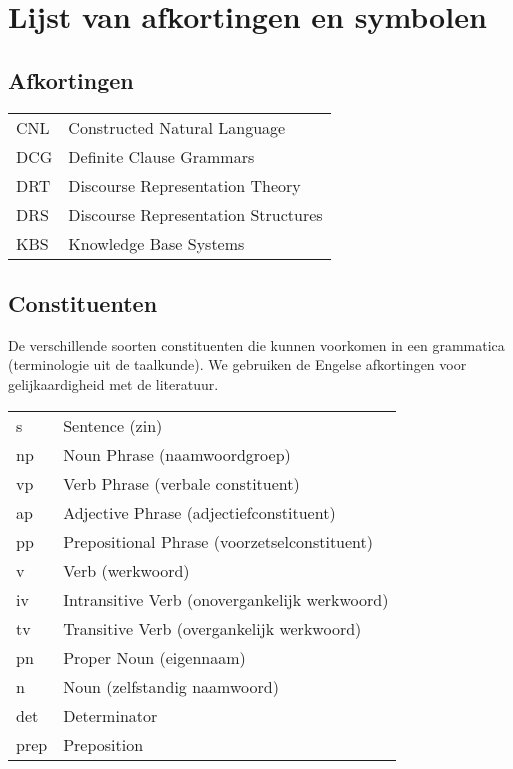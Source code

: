 \chapter{Lijst van afkortingen en symbolen}
\section*{Afkortingen}
\begin{flushleft}
  \renewcommand{\arraystretch}{1.1}
  \begin{tabularx}{\textwidth}{@{}p{12mm}X@{}}
    CNL   & Constructed Natural Language \\
    DCG   & Definite Clause Grammars \\
    DRT   & Discourse Representation Theory \\
    DRS   & Discourse Representation Structures \\
    KBS   & Knowledge Base Systems \\
  \end{tabularx}
\end{flushleft}
\section*{Constituenten}
De verschillende soorten constituenten die kunnen voorkomen in een grammatica (terminologie uit de taalkunde). We gebruiken de Engelse afkortingen voor gelijkaardigheid met de literatuur.
\begin{flushleft}
  \renewcommand{\arraystretch}{1.1}
  \begin{tabularx}{\textwidth}{@{}p{12mm}X@{}}
    s     & Sentence (zin) \\
    np    & Noun Phrase (naamwoordgroep) \\
    vp    & Verb Phrase (verbale constituent) \\
    ap    & Adjective Phrase (adjectiefconstituent) \\
    pp    & Prepositional Phrase (voorzetselconstituent) \\
    v     & Verb (werkwoord) \\
    iv    & Intransitive Verb (onovergankelijk werkwoord) \\
    tv    & Transitive Verb (overgankelijk werkwoord) \\
    pn    & Proper Noun (eigennaam) \\
    n     & Noun (zelfstandig naamwoord) \\
    det   & Determinator \\
    prep  & Preposition \\
  \end{tabularx}
\end{flushleft}

